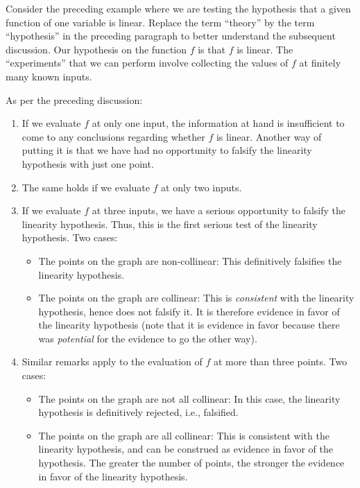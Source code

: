 \documentclass[10pt]{amsart}
\begin{document}
Consider the preceding example where we are testing the hypothesis
that a given function of one variable is linear. Replace the term
``theory'' by the term ``hypothesis'' in the preceding paragraph to
better understand the subsequent discussion. Our hypothesis on the
function $f$ is that $f$ is linear. The ``experiments'' that we can
perform involve collecting the values of $f$ at finitely many known
inputs.

As per the preceding discussion:

\begin{enumerate}
\item If we evaluate $f$ at only one input, the information at hand is
  insufficient to come to any conclusions regarding whether $f$ is
  linear. Another way of putting it is that we have had no opportunity
  to falsify the linearity hypothesis with just one point.
\item The same holds if we evaluate $f$ at only two inputs.
\item If we evaluate $f$ at three inputs, we have a serious
  opportunity to falsify the linearity hypothesis. Thus, this is the
  first serious test of the linearity hypothesis. Two cases:

  \begin{itemize}
  \item The points on the graph are non-collinear: This definitively
    falsifies the linearity hypothesis.
  \item The points on the graph are collinear: This is {\em
    consistent} with the linearity hypothesis, hence does not falsify
    it. It is therefore evidence in favor of the linearity hypothesis
    (note that it is evidence in favor because there was {\em
      potential} for the evidence to go the other way).
  \end{itemize}
\item Similar remarks apply to the evaluation of $f$ at more than
  three points. Two cases:

  \begin{itemize}
  \item The points on the graph are not all collinear: In this case,
    the linearity hypothesis is definitively rejected, i.e., falsified.
  \item The points on the graph are all collinear: This is consistent
    with the linearity hypothesis, and can be construed as evidence in
    favor of the hypothesis. The greater the number of points, the
    stronger the evidence in favor of the linearity hypothesis.
  \end{itemize}
\end{enumerate}
\end{document}
